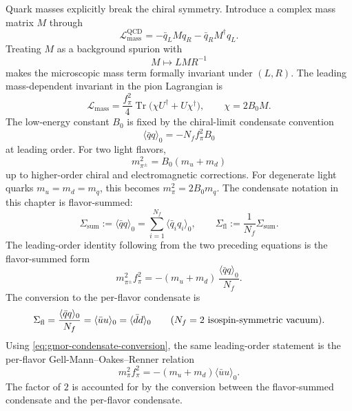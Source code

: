Quark masses explicitly break the chiral symmetry.  Introduce a complex mass
matrix \(M\) through
\[
  \mathcal L_{\mathrm{mass}}^{\mathrm{QCD}}
  =
  -\bar q_L M q_R-\bar q_RM^\dagger q_L .
\]
Treating \(M\) as a background spurion with
\[
  M\longmapsto LMR^{-1}
\]
makes the microscopic mass term formally invariant under
\((L,R)\).  The leading mass-dependent invariant in the pion Lagrangian is
\begin{equation}
  \mathcal L_{\mathrm{mass}}
  =
  \frac{f_\pi^2}{4}
  \operatorname{Tr}
  \bigl(\chi U^\dagger+U\chi^\dagger\bigr),
  \qquad
  \chi=2B_0M .
  \label{eq:chiral-mass-spurion}
\end{equation}
The low-energy constant \(B_0\) is fixed by the chiral-limit condensate
convention
\[
  \langle\bar q q\rangle_0
  =
  -N_f f_\pi^2B_0
\]
at leading order.  For two light flavors,
\[
  m_{\pi^\pm}^2
  =
  B_0(m_u+m_d)
\]
up to higher-order chiral and electromagnetic corrections.  For degenerate
light quarks \(m_u=m_d=m_q\), this becomes \(m_\pi^2=2B_0m_q\).
The condensate notation in this chapter is flavor-summed:
\[
  \Sigma_{\mathrm{sum}}
  :=
  \langle\bar q q\rangle_0
  =
  \sum_{i=1}^{N_f}\langle\bar q_iq_i\rangle_0,
  \qquad
  \Sigma_{\mathrm{fl}}
  :=
  \frac{1}{N_f}\Sigma_{\mathrm{sum}} .
\]
The leading-order identity following from the two preceding equations is the
flavor-summed form
\begin{equation}
  m_{\pi^\pm}^2f_\pi^2
  =
  -(m_u+m_d)\,
  \frac{\langle\bar q q\rangle_0}{N_f}.
  \label{eq:gmor-flavor-summed}
\end{equation}
The conversion to the per-flavor condensate is
\begin{equation}
  \Sigma_{\mathrm{fl}}
  =
  \frac{\langle\bar q q\rangle_0}{N_f}
  =
  \langle\bar u u\rangle_0
  =
  \langle\bar d d\rangle_0
  \qquad
  (N_f=2\hbox{ isospin-symmetric vacuum}).
  \label{eq:gmor-condensate-conversion}
\end{equation}
Using \eqref{eq:gmor-condensate-conversion}, the same leading-order statement is
the per-flavor Gell-Mann--Oakes--Renner relation
\begin{equation}
  m_{\pi}^2f_\pi^2
  =
  -(m_u+m_d)\langle\bar u u\rangle_0 .
  \label{eq:gmor-per-flavor}
\end{equation}
The factor of \(2\) is accounted for by the conversion between the
flavor-summed condensate and the per-flavor condensate.

